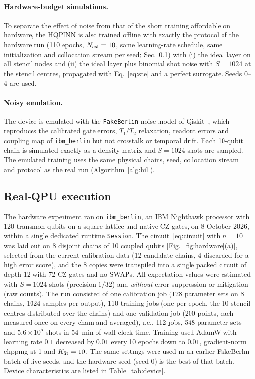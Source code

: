 \documentclass[floatfix,aps,pra,twocolumn,superscriptaddress,10pt,nofootinbib]{revtex4-2}
\newcommand{\Ncol}{N_{\rm col}}
\begin{document}
\paragraph{Hardware-budget simulations.} To separate the effect of noise from that of the short training affordable on hardware, the HQPINN is also trained offline with exactly the protocol of the hardware run (110 epochs, $\Ncol=10$, same learning-rate schedule, same initialization and collocation stream per seed; Sec.~\ref{sec:methods_hw}) with (i) the ideal layer on all stencil nodes and (ii) the ideal layer plus binomial shot noise with $S=1024$ at the stencil centres, propagated with Eq.~\eqref{eq:ste} and a perfect surrogate. Seeds 0--4 are used.

\paragraph{Noisy emulation.} The device is emulated with the \texttt{FakeBerlin} noise model of Qiskit~\cite{javadiabhari2024qiskit}, which reproduces the calibrated gate errors, $T_1/T_2$ relaxation, readout errors and coupling map of \texttt{ibm\_berlin} but not crosstalk or temporal drift. Each 10-qubit chain is simulated exactly as a density matrix and $S=1024$ shots are sampled. The emulated training uses the same physical chains, seed, collocation stream and protocol as the real run (Algorithm~\ref{alg:hil}).

\subsection{Real-QPU execution}\label{sec:methods_hw}
The hardware experiment ran on \texttt{ibm\_berlin}, an IBM Nighthawk processor with 120 transmon qubits on a square lattice and native CZ gates, on 8 October 2026, within a single dedicated runtime \texttt{Session}. The circuit~\eqref{eq:circuit} with $n=10$ was laid out on 8 disjoint chains of 10 coupled qubits [Fig.~\ref{fig:hardware}(a)], selected from the current calibration data (12 candidate chains, 4 discarded for a high error score), and the 8 copies were transpiled into a single packed circuit of depth 12 with 72 CZ gates and no SWAPs. All expectation values were estimated with $S=1024$ shots (precision $1/32$) and \emph{without} error suppression or mitigation (raw counts). The run consisted of one calibration job (128 parameter sets on 8 chains, 1024 samples per output), 110 training jobs (one per epoch, the 10 stencil centres distributed over the chains) and one validation job (200 points, each measured once on every chain and averaged), i.e., 112 jobs, 548 parameter sets and $5.6\times10^5$ shots in 54~min of wall-clock time. Training used AdamW with learning rate $0.1$ decreased by $0.01$ every 10 epochs down to $0.01$, gradient-norm clipping at 1 and $K_{\rm fit}=10$. The same settings were used in an earlier FakeBerlin batch of five seeds, and the hardware seed (seed 0) is the best of that batch. Device characteristics are listed in Table~\ref{tab:device}.
\end{document}
